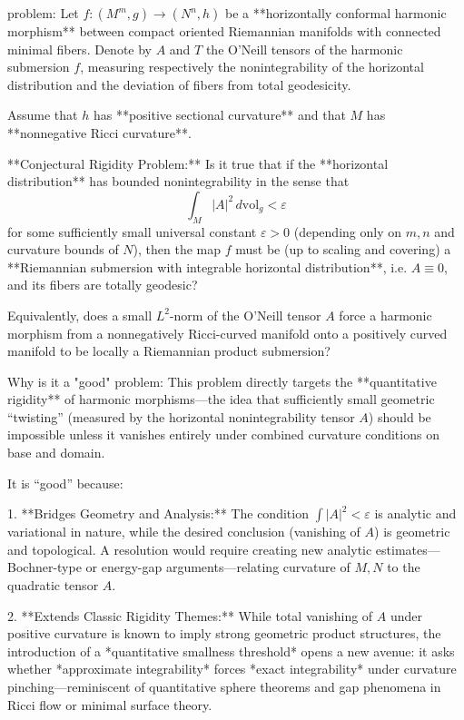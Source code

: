 problem:  
Let \( f: (M^{m}, g) \to (N^{n}, h) \) be a **horizontally conformal harmonic morphism** between compact oriented Riemannian manifolds with connected minimal fibers.  Denote by \(A\) and \(T\) the O’Neill tensors of the harmonic submersion \(f\), measuring respectively the nonintegrability of the horizontal distribution and the deviation of fibers from total geodesicity.  

Assume that \(h\) has **positive sectional curvature** and that \(M\) has **nonnegative Ricci curvature**.  

**Conjectural Rigidity Problem:**  
Is it true that if the **horizontal distribution** has bounded nonintegrability in the sense that  
\[
\int_M |A|^2 \, d\mathrm{vol}_g < \varepsilon
\]
for some sufficiently small universal constant \(\varepsilon>0\) (depending only on \(m,n\) and curvature bounds of \(N\)), then the map \(f\) must be (up to scaling and covering) a **Riemannian submersion with integrable horizontal distribution**, i.e. \(A \equiv 0\), and its fibers are totally geodesic?  

Equivalently, does a small \(L^2\)-norm of the O’Neill tensor \(A\) force a harmonic morphism from a nonnegatively Ricci-curved manifold onto a positively curved manifold to be locally a Riemannian product submersion?  

Why is it a "good" problem:  
This problem directly targets the **quantitative rigidity** of harmonic morphisms—the idea that sufficiently small geometric “twisting” (measured by the horizontal nonintegrability tensor \(A\)) should be impossible unless it vanishes entirely under combined curvature conditions on base and domain.  

It is “good” because:  

1. **Bridges Geometry and Analysis:** The condition \(\int |A|^2 < \varepsilon\) is analytic and variational in nature, while the desired conclusion (vanishing of \(A\)) is geometric and topological. A resolution would require creating new analytic estimates—Bochner-type or energy-gap arguments—relating curvature of \(M,N\) to the quadratic tensor \(A\).  

2. **Extends Classic Rigidity Themes:** While total vanishing of \(A\) under positive curvature is known to imply strong geometric product structures, the introduction of a *quantitative smallness threshold* opens a new avenue: it asks whether *approximate integrability* forces *exact integrability* under curvature pinching—reminiscent of quantitative sphere theorems and gap phenomena in Ricci flow or minimal surface theory.  

